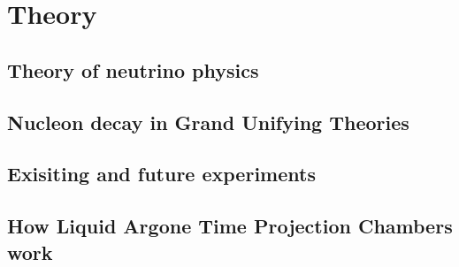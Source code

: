 
\chapter{Theory}  %

\ifpdf
    \graphicspath{{Theory/Figs/Raster/}{Theory/Figs/PDF/}{Theory/Figs/}}
\else
    \graphicspath{{Theory/Figs/Vector/}{Theory/Figs/}}
\fi

\section{Theory of neutrino physics} %

\section{Nucleon decay in Grand Unifying Theories}  %

\section{Exisiting and future experiments} %

\section{How Liquid Argone Time Projection Chambers work} %
